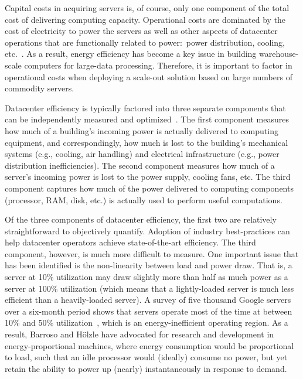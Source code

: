 Capital costs in acquiring servers is, of course, only one component
of the total cost of delivering computing capacity.  Operational costs
are dominated by the cost of electricity to power the servers as well
as other aspects of datacenter operations that are functionally
related to power:\ power distribution, cooling,
etc.~\cite{Hamilton_2009,Barroso_Holzle_2009}.  As a result, energy
efficiency has become a key issue in building warehouse-scale
computers for large-data processing.  Therefore, it is important to
factor in operational costs when deploying a scale-out solution based
on large numbers of commodity servers.

Datacenter efficiency is typically factored into three separate
components that can be independently measured and
optimized~\cite{Barroso_Holzle_2009}.  The first component measures
how much of a building's incoming power is actually delivered to
computing equipment, and correspondingly, how much is lost to the
building's mechanical systems (e.g., cooling, air handling) and
electrical infrastructure (e.g., power distribution inefficiencies).
The second component measures how much of a server's incoming power is
lost to the power supply, cooling fans, etc.  The third component
captures how much of the power delivered to computing components
(processor, RAM, disk, etc.) is actually used to perform useful
computations.

Of the three components of datacenter efficiency, the first two are
relatively straightforward to objectively quantify.  Adoption of
industry best-practices can help datacenter operators achieve
state-of-the-art efficiency.  The third component, however, is much
more difficult to measure.  One important issue that has been
identified is the non-linearity between load and power draw.  That is,
a server at 10\% utilization may draw slightly more than half as much
power as a server at 100\% utilization (which means that a
lightly-loaded server is much less efficient than a heavily-loaded
server).  A survey of five thousand Google servers over a six-month
period shows that servers operate most of the time at between 10\% and
50\% utilization~\cite{Barroso_Holzle_2007}, which is an
energy-inefficient operating region.  As a result, Barroso and
H\"{o}lzle have advocated for research and development in
energy-proportional machines, where energy consumption would be
proportional to load, such that an idle processor would (ideally)
consume no power, but yet retain the ability to power up (nearly)
instantaneously in response to demand.

